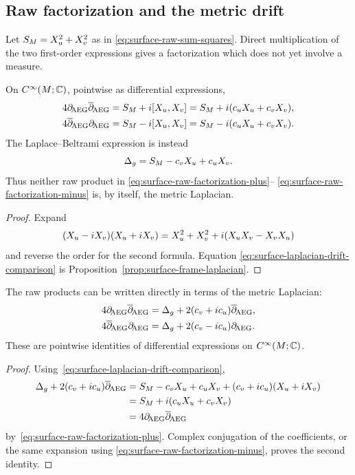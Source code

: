 \subsection{Raw factorization and the metric drift}

Let $S_M=X_u^2+X_v^2$ as in
\eqref{eq:surface-raw-sum-squares}.  Direct multiplication of the two
first-order expressions gives a factorization which does not yet involve a
measure.

\begin{proposition}
\label{prop:surface-raw-factorization}
On $C^\infty(M;\mathbb{C})$, pointwise as differential expressions,
\begin{align}
 4\partial_{\!\mathrm{AEG}}\overline\partial_{\!\mathrm{AEG}}
 &=S_M+i[X_u,X_v]
   =S_M+i(c_uX_u+c_vX_v),
 \label{eq:surface-raw-factorization-plus}\\
 4\overline\partial_{\!\mathrm{AEG}}\partial_{\!\mathrm{AEG}}
 &=S_M-i[X_u,X_v]
   =S_M-i(c_uX_u+c_vX_v).
 \label{eq:surface-raw-factorization-minus}
\end{align}
The Laplace--Beltrami expression is instead
\begin{equation}\label{eq:surface-laplacian-drift-comparison}
 \Delta_g=S_M-c_vX_u+c_uX_v.
\end{equation}
Thus neither raw product in
\eqref{eq:surface-raw-factorization-plus}--
\eqref{eq:surface-raw-factorization-minus} is, by itself, the metric Laplacian.
\end{proposition}

\begin{proof}
Expand
\[
 (X_u-iX_v)(X_u+iX_v)
 =X_u^2+X_v^2+i(X_uX_v-X_vX_u)
\]
and reverse the order for the second formula.  Equation
\eqref{eq:surface-laplacian-drift-comparison} is
Proposition~\ref{prop:surface-frame-laplacian}.
\end{proof}

\begin{proposition}
\label{prop:surface-exact-drift-factorizations}
The raw products can be written directly in terms of the metric Laplacian:
\begin{align}
 4\partial_{\!\mathrm{AEG}}\overline\partial_{\!\mathrm{AEG}}
 &=\Delta_g+2(c_v+ic_u)\overline\partial_{\!\mathrm{AEG}},
 \label{eq:surface-exact-drift-factorization-plus}\\
 4\overline\partial_{\!\mathrm{AEG}}\partial_{\!\mathrm{AEG}}
 &=\Delta_g+2(c_v-ic_u)\partial_{\!\mathrm{AEG}}.
 \label{eq:surface-exact-drift-factorization-minus}
\end{align}
These are pointwise identities of differential expressions on
$C^\infty(M;\mathbb{C})$.
\end{proposition}

\begin{proof}
Using~\eqref{eq:surface-laplacian-drift-comparison},
\begin{align*}
 \Delta_g+2(c_v+ic_u)\overline\partial_{\!\mathrm{AEG}}
 &=S_M-c_vX_u+c_uX_v
   +(c_v+ic_u)(X_u+iX_v)\\
 &=S_M+i(c_uX_u+c_vX_v)\\
 &=4\partial_{\!\mathrm{AEG}}\overline\partial_{\!\mathrm{AEG}}
\end{align*}
by~\eqref{eq:surface-raw-factorization-plus}.  Complex conjugation of the
coefficients, or the same expansion using
\eqref{eq:surface-raw-factorization-minus}, proves the second identity.
\end{proof}

